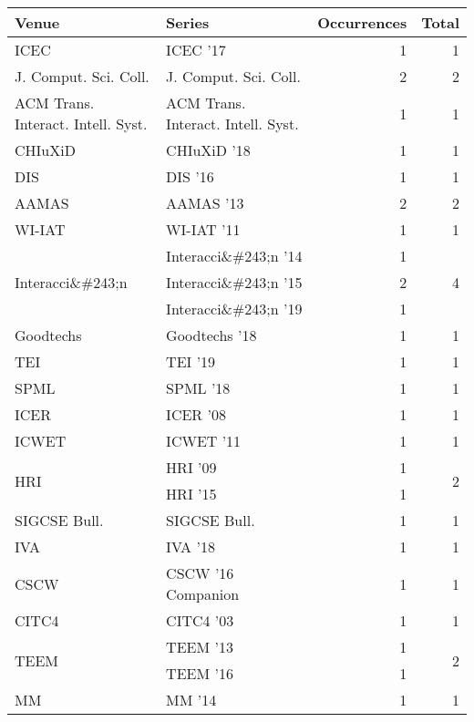 \begin{table*}[t]
\begin{tabular}{llrr}
Venue & Series & Occurrences & Total\\\hline
\multirow{1}{*}{ICEC } & ICEC '17 & 1 & \multirow{1}{*}{1}\\
\multirow{1}{*}{J. Comput. Sci. Coll.} & J. Comput. Sci. Coll. & 2 & \multirow{1}{*}{2}\\
\multirow{1}{*}{ACM Trans. Interact. Intell. Syst.} & ACM Trans. Interact. Intell. Syst. & 1 & \multirow{1}{*}{1}\\
\multirow{1}{*}{CHIuXiD } & CHIuXiD '18 & 1 & \multirow{1}{*}{1}\\
\multirow{1}{*}{DIS } & DIS '16 & 1 & \multirow{1}{*}{1}\\
\multirow{1}{*}{AAMAS } & AAMAS '13 & 2 & \multirow{1}{*}{2}\\
\multirow{1}{*}{WI-IAT } & WI-IAT '11 & 1 & \multirow{1}{*}{1}\\
\multirow{3}{*}{Interacci\&\#243;n } & Interacci\&\#243;n '14 & 1 & \multirow{3}{*}{4}\\
& Interacci\&\#243;n '15 & 2 &\\
& Interacci\&\#243;n '19 & 1 &\\
\multirow{1}{*}{Goodtechs } & Goodtechs '18 & 1 & \multirow{1}{*}{1}\\
\multirow{1}{*}{TEI } & TEI '19 & 1 & \multirow{1}{*}{1}\\
\multirow{1}{*}{SPML } & SPML '18 & 1 & \multirow{1}{*}{1}\\
\multirow{1}{*}{ICER } & ICER '08 & 1 & \multirow{1}{*}{1}\\
\multirow{1}{*}{ICWET } & ICWET '11 & 1 & \multirow{1}{*}{1}\\
\multirow{2}{*}{HRI } & HRI '09 & 1 & \multirow{2}{*}{2}\\
& HRI '15 & 1 &\\
\multirow{1}{*}{SIGCSE Bull.} & SIGCSE Bull. & 1 & \multirow{1}{*}{1}\\
\multirow{1}{*}{IVA } & IVA '18 & 1 & \multirow{1}{*}{1}\\
\multirow{1}{*}{CSCW } & CSCW '16 Companion & 1 & \multirow{1}{*}{1}\\
\multirow{1}{*}{CITC4 } & CITC4 '03 & 1 & \multirow{1}{*}{1}\\
\multirow{2}{*}{TEEM } & TEEM '13 & 1 & \multirow{2}{*}{2}\\
& TEEM '16 & 1 &\\
\multirow{1}{*}{MM } & MM '14 & 1 & \multirow{1}{*}{1}\\

\end{tabular}
\end{table*}
